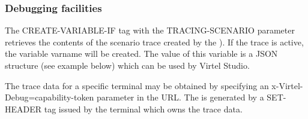 \documentclass[letterpaper,10pt,english]{sphinxmanual}
\begin{document}
\subsubsection{Debugging facilities}
\label{\detokenize{User_Guide:debugging-facilities}}\label{\detokenize{User_Guide:v457ug-debugging-create-variable}}\label{\detokenize{User_Guide:v457ug-create-variable-if}}

\begin{sphinxVerbatim}[commandchars=\\\{\}]
  
\end{sphinxVerbatim}

The CREATE-VARIABLE-IF tag with the TRACING-SCENARIO parameter retrieves the contents of the scenario trace created by the {\hyperref[\detokenize{User_Guide:v457ug-capability-tokens}]{}}). If the trace is active, the variable varname will be created. The value of this variable is a JSON structure (see example below) which can be used by Virtel Studio.

The trace data for a specific terminal may be obtained by specifying an x-Virtel-Debug=capability-token parameter in the URL. The {\hyperref[\detokenize{User_Guide:v457ug-capability-tokens}]{}} is generated by a SET-HEADER tag issued by the terminal which owns the trace data.
\end{document}

